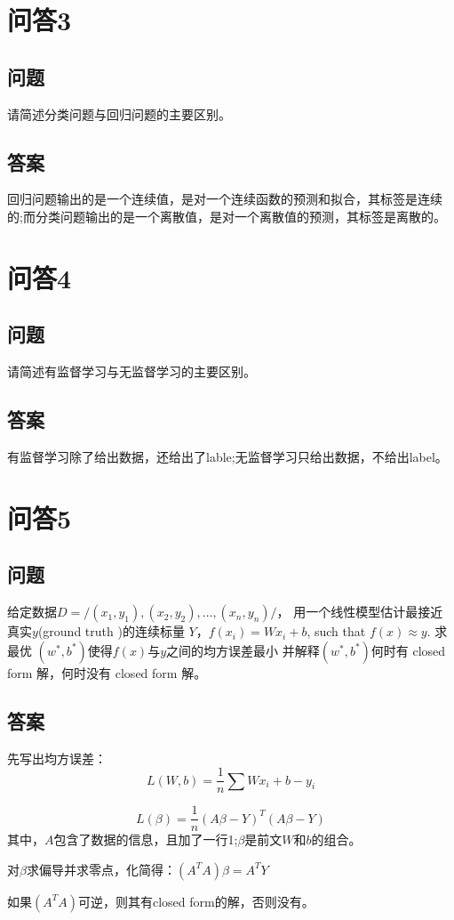 \documentclass[UTF8]{ctexart}
\begin{document}
\section{问答3}
\subsection{问题}
请简述分类问题与回归问题的主要区别。
\subsection{答案}
回归问题输出的是一个连续值，是对一个连续函数的预测和拟合，其标签是连续的;而分类问题输出的是一个离散值，是对一个离散值的预测，其标签是离散的。
\section{问答4}
\subsection{问题}
请简述有监督学习与无监督学习的主要区别。
\subsection{答案}
有监督学习除了给出数据，还给出了lable;无监督学习只给出数据，不给出label。

\section{问答5}
\subsection{问题}给定数据$D = /{(x_1, y_1), (x_2, y_2), … , (x_n, y_n)/}$，
用一个线性模型估计最接近真实$y$(ground truth )的连续标量 $Y$，$f(x_i ) = Wx_i + b$, such that $f(x) \approx y$.
求最优 $(w^*, b^*)$使得$f(x)$与$y$之间的均方误差最小
并解释$(w^*, b^*)$何时有 closed form 解，何时没有 closed form 解。
\subsection{答案}
先写出均方误差：$$L(W,b) = \frac{1}{n}\sum{Wx_i+b-y_i}$$

$$L(\beta)=\frac{1}{n}(A\beta-Y)^T(A\beta-Y)$$其中，$A$包含了数据的信息，且加了一行1;$\beta$是前文$W$和$b$的组合。

对$\beta$求偏导并求零点，化简得：$(A^TA)\beta = A^TY$

如果$(A^TA)$可逆，则其有closed form的解，否则没有。
\end{document}
